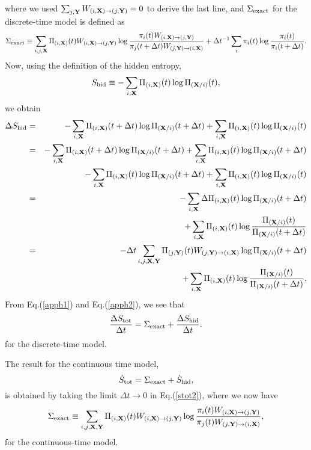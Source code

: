 \documentclass[aps,pre,amsmath,amssymb,floatfix,preprint,nofootinbib]{revtex4}
\begin{document}
where we used  $\sum_{j,{\bf Y}} W_{(i,{\bf X}) \to (j,{\bf Y})}=0$ to derive the last line, and $\Sigma_{\rm exact}$ for the discrete-time model is defined as
\begin{equation}
\Sigma_{\rm exact} \equiv \sum_{i,j,{\bf X}}  \Pi_{(i,{\bf X})}(t) W_{(i,{\bf X}) \to (j,{\bf Y})} \log \frac{\pi_{i}(t) W_{(i,{\bf X}) \to (j,{\bf Y})}}{\pi_{j}(t+ \Delta t) W_{(j,{\bf Y}) \to (i,{\bf X})}} + \Delta t^{-1} \sum_{i } \pi_{i}(t)  \log \frac{\pi_{i}(t) }{\pi_{i}(t+ \Delta t)}.
\end{equation}
Now, using the definition of the hidden entropy,
\begin{equation}
S_{\rm hid} \equiv  -\sum_{i,{\bf X}} \Pi_{(i,{\bf X})}(t)  \log \Pi_{({\bf X}/i)}(t),\label{hid2}
\end{equation}
we obtain
\begin{eqnarray}
\Delta S_{\rm hid}
&=&  -\sum_{i,{\bf X}}  \Pi_{(i,{\bf X})}(t + \Delta t)  \log \Pi_{({\bf X}/i)}(t + \Delta t) + \sum_{i,{\bf X}} \Pi_{(i,{\bf X})}(t)  \log \Pi_{({\bf X}/i)}(t)\nonumber\\
&=& -\sum_{i,{\bf X}}  \Pi_{(i,{\bf X})}(t + \Delta t)  \log \Pi_{({\bf X}/i)}(t + \Delta t) +\sum_{i,{\bf X}}  \Pi_{(i,{\bf X})}(t )  \log \Pi_{({\bf X}/i)}(t + \Delta t)\nonumber\\
&& - \sum_{i,{\bf X}} \Pi_{(i,{\bf X})}(t)  \log \Pi_{({\bf X}/i)}(t + \Delta t) + \sum_{i,{\bf X}} \Pi_{(i,{\bf X})}(t)  \log \Pi_{({\bf X}/i)}(t)\nonumber\\
&=& -\sum_{i,{\bf X}}  
\Delta \Pi_{(i,{\bf X})}(t)  \log \Pi_{({\bf X}/i)}(t + \Delta t) \nonumber\\
&&  + \sum_{i,{\bf X}} \Pi_{(i,{\bf X})}(t)  \log \frac{\Pi_{({\bf X}/i)}(t)}{\Pi_{({\bf X}/i)}(t + \Delta t)}\nonumber\\
&=& - \Delta t \sum_{i,j,{\bf X},{\bf Y}}  \Pi_{(j,{\bf Y})}(t) W_{(j,{\bf Y}) \to (i,{\bf X})}  \log \Pi_{({\bf X}/i)}(t + \Delta t)\nonumber\\
&&+ \sum_{i,{\bf X}} \Pi_{(i,{\bf X})}(t)  \log \frac{\Pi_{({\bf X}/i)}(t)}{\Pi_{({\bf X}/i)}(t + \Delta t)}.
\label{apph2}
\end{eqnarray}
From Eq.(\ref{apph1}) and Eq.(\ref{apph2}), we see that
\begin{equation}
\frac{\Delta S_{\rm tot}}{\Delta t} = \Sigma_{\rm exact} + \frac{\Delta S_{\rm hid}}{\Delta t}.\label{stot2}
\end{equation}
for the discrete-time model.

The result for the continuous time model,
\begin{equation}
\dot S_{\rm tot} = \Sigma_{\rm exact} + \dot S_{\rm hid},
\end{equation}
is obtained by taking the limit $\Delta t \to 0$ in Eq.(\ref{stot2}), where we now have
\begin{equation}
\Sigma_{\rm exact} \equiv  \sum_{i,j,{\bf X},{\bf Y}}   \Pi_{(i,{\bf X})}(t) W_{(i,{\bf X}) \to (j,{\bf Y})}  \log \frac{\pi_i (t) W_{(i,{\bf X}) \to (j,{\bf Y})} }{\pi_j (t) W_{(j,{\bf Y}) \to (i,{\bf X})} },
\end{equation}
for the continuous-time model.
\end{document}
